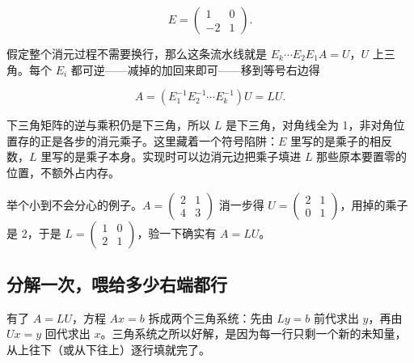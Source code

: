 \[
E=\begin{pmatrix}1&0\\-2&1\end{pmatrix}.
\]

假定整个消元过程不需要换行，那么这条流水线就是 \(E_k\cdots E_2E_1A=U\)，\(U\) 上三角。每个 \(E_i\) 都可逆——减掉的加回来即可——移到等号右边得

\[
A=(E_1^{-1}E_2^{-1}\cdots E_k^{-1})U=LU.
\]

下三角矩阵的逆与乘积仍是下三角，所以 \(L\) 是下三角，对角线全为 1，非对角位置存的正是各步的消元乘子。这里藏着一个符号陷阱：\(E\) 里写的是乘子的相反数，\(L\) 里写的是乘子本身。实现时可以边消元边把乘子填进 \(L\) 那些原本要置零的位置，不额外占内存。

举个小到不会分心的例子。\(A=\begin{pmatrix}2&1\\4&3\end{pmatrix}\) 消一步得 \(U=\begin{pmatrix}2&1\\0&1\end{pmatrix}\)，用掉的乘子是 2，于是 \(L=\begin{pmatrix}1&0\\2&1\end{pmatrix}\)，验一下确实有 \(A=LU\)。

\subsection{分解一次，喂给多少右端都行}

有了 \(A=LU\)，方程 \(Ax=b\) 拆成两个三角系统：先由 \(Ly=b\) 前代求出 \(y\)，再由 \(Ux=y\) 回代求出 \(x\)。三角系统之所以好解，是因为每一行只剩一个新的未知量，从上往下（或从下往上）逐行填就完了。

